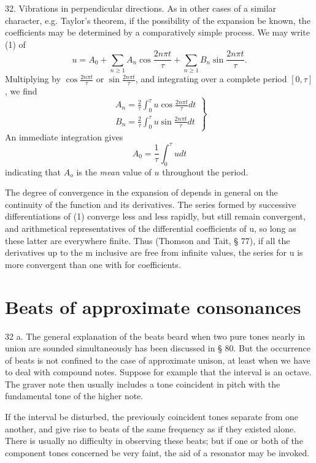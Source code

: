 32.  Vibrations in perpendicular directions. As in other cases of a similar
character, e.g. Taylor's theorem, if the possibility of the expansion be known,
the coefficients may be determined by a comparatively simple process. We may
write (1) of
\[
u=A_0+\sum_{n\geq 1} A_n \cos \frac{2 n \pi t}{\tau}+
\sum_{n\geq 1} B_n \sin \frac{2 n \pi t}{\tau} \tag{1}.
\]
Multiplying by \(\cos \frac{2 n \pi t}{\tau}\) or
\(\sin \frac{2 n \pi t}{\tau}\), and integrating over a complete period \([0,\tau]\),
we find
\[
\left.\begin{array}{l} A_n=\frac{2}{\tau} \int_0^\tau u \cos \frac{2 n \pi t}{\tau} d t \\
B_n=\frac{2}{\tau} \int_0^\tau u \sin \frac{2 n \pi t}{\tau} d t
\end{array}\right\} \tag{2}
\]
An immediate integration gives
\[A_0=\frac{1}{\tau} \int_0^\tau u d t \tag{3} \]
indicating that \(A_o\) is
the \textit{mean} value of \(u\) throughout the period.

The degree of convergence in the expansion of depends in general on the
continuity of the function and its derivatives. The series formed by successive
differentiations of (1) converge less and less rapidly, but still remain
convergent, and arithmetical representatives of the differential coefficients
of u, so long as these latter are everywhere finite. Thus (Thomson and Tait, \S
77), if all the derivatives up to the m inclusive are free from infinite
values, the series for u is more convergent than one with for coefficients.

\section{Beats of approximate consonances}
32 a.  The general explanation of the beats beard when two pure tones nearly in
union are sounded simultaneously has been discussed in § 80. But the occurrence
of beats is not confined to the case of approximate unison, at least when we
have to deal with compound notes. Suppose for example that the interval is an
octave. The graver note then usually includes a tone coincident in pitch with
the fundamental tone of the higher note.

If the interval be disturbed, the previously coincident tones separate
from one another, and give rise to beats of the same frequency as if
they existed alone. There is usually no difficulty in observing these
beats; but if one or both of the component tones concerned be very
faint, the aid of a resonator may be invoked.

